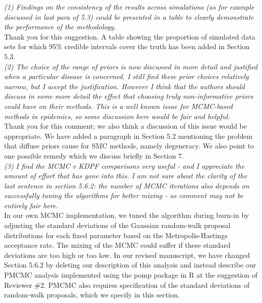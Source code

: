 \documentclass{article}
\begin{document}
\noindent \emph{(1) Findings on the consistency of the results across simulations (as for example discussed in last para of 5.3) could be presented in a table to clearly demonstrate the performance of the methodology.} \\

Thank you for this suggestion. A table showing the proportion of simulated data sets for which 95\% credible intervals cover the truth has been added in Section 5.3. \\

\noindent \emph{(2) The choice of the range of priors is now discussed in more detail and justified when a particular disease is concerned. I still find these prior choices relatively narrow, but I accept the justification. However I think that the authors should discuss in some more detail the effect that choosing truly non-informative priors could have on their methods. This is a well known issue for MCMC-based methods in epidemics, so some discussion here would be fair and helpful.} \\

Thank you for this comment; we also think a discussion of this issue would be appropriate. We have added a paragraph in Section 5.2 mentioning the problem that diffuse priors cause for SMC methods, namely degeneracy. We also point to one possible remedy which we discuss briefly in Section 7. \\

\noindent \emph{(3) I find the MCMC v KDPF comparisons very useful - and I appreciate the amount of effort that has gone into this. I am not sure about the clarity of the last sentence in section 5.6.2: the number of MCMC iterations also depends on successfully tuning the algorithms for better mixing - so comment may not be entirely fair here.} \\

In our own MCMC implementation, we tuned the algorithm during burn-in by adjusting the standard deviations of the Gaussian random-walk proposal distributions for each fixed parameter based on the Metropolis-Hastings acceptance rate. The mixing of the MCMC could suffer if these standard deviations are too high or too low. In our revised manuscript, we have changed Section 5.6.2 by deleting our description of this analysis and instead describe our PMCMC analysis implemented using the pomp package in R at the suggestion of Reviewer \#2. PMCMC also requires specification of the standard deviations of random-walk proposals, which we specify in this section. \\
\end{document}
